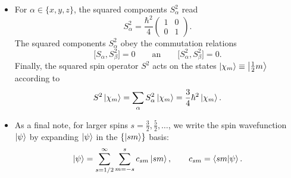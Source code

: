 \documentclass[11pt, a4paper]{article}
\newcommand{\eqtext}[1]{\qquad \text{#1} \qquad}
\newcommand{\p}{\psi}  %
\begin{document}
\begin{itemize}
	
	\item For $ \alpha \in \{x, y, z\} $, the squared components $ S_{\alpha}^{2} $ read
	\begin{equation*}
		S_{\alpha}^{2} = \frac{\hbar^{2}}{4}
		\begin{pmatrix}
			1 & 0\\
			0 & 1
		\end{pmatrix}.
	\end{equation*}
	The squared components $ S_{\alpha}^{2} $ obey the commutation relations
	\begin{equation*}
		\big [S_{\alpha}, S_{\beta}^{2}\big ] = 0 \eqtext{an} \big [S_{\alpha}^{2}, S_{\beta}^{2}\big ] = 0.
	\end{equation*}
	Finally, the squared spin operator $ S^{2} $ acts on the states $ \ket{\chi_{m}} \equiv \ket{\tfrac{1}{2}m} $ according to
	\begin{equation*}
		S^{2}\ket{\chi_{m}} = \sum_{\alpha}S_{\alpha}^{2} \ket{\chi_{m}} = \frac{3}{4}\hbar^{2} \ket{\chi_{m}}.
	\end{equation*}
	
	\item As a final note, for larger spins $ s = \frac{3}{2}, \frac{5}{2}, \ldots $, we write the spin wavefunction $ \ket{\p} $ by expanding $ \ket{\p} $ in the $ \{\ket{sm}\} $ basis:
	\begin{equation*}
		\ket{\p} = \sum_{s = 1/2}^{\infty}\sum_{m = -s}^{s}c_{sm}\ket{sm}, \qquad c_{sm} = \braket{sm}{\psi}.
	\end{equation*}
	
\end{itemize}
\end{document}
